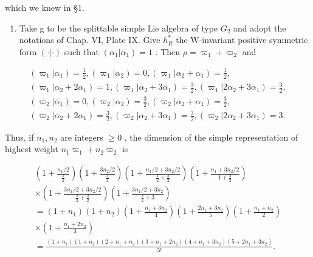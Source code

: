which we knew in §1.

\begin{enumerate}
\def\labelenumi{\arabic{enumi})}
\setcounter{enumi}{1}
\tightlist
\item
  Take g to be the splittable simple Lie algebra of type \(G_{2}\) and adopt the notations of Chap. VI, Plate IX. Give \(h_{R}^{*}\) the W-invariant positive symmetric form \((\cdot|\cdot)\) such that \((\alpha_{1}|\alpha_{1})=1\) . Then \(\rho=\varpi_{1}+\varpi_{2}\) and
\end{enumerate}

\[
\begin{array}{c} (\varpi_ {1} | \alpha_ {1}) = \frac {1}{2}, (\varpi_ {1} | \alpha_ {2}) = 0, (\varpi_ {1} | \alpha_ {2} + \alpha_ {1}) = \frac {1}{2}, \\ (\varpi_ {1} | \alpha_ {2} + 2 \alpha_ {1}) = 1, (\varpi_ {1} | \alpha_ {2} + 3 \alpha_ {1}) = \frac {3}{2}, (\varpi_ {1} | 2 \alpha_ {2} + 3 \alpha_ {1}) = \frac {3}{2}, \\ (\varpi_ {2} | \alpha_ {1}) = 0, (\varpi_ {2} | \alpha_ {2}) = \frac {3}{2}, (\varpi_ {2} | \alpha_ {2} + \alpha_ {1}) = \frac {3}{2}, \\ (\varpi_ {2} | \alpha_ {2} + 2 \alpha_ {1}) = \frac {3}{2}, (\varpi_ {2} | \alpha_ {2} + 3 \alpha_ {1}) = \frac {3}{2}, (\varpi_ {2} | 2 \alpha_ {2} + 3 \alpha_ {1}) = 3. \end{array}
\]

Thus, if \(n_1, n_2\) are integers \(\geq 0\) , the dimension of the simple representation of highest weight \(n_1\varpi_1 + n_2\varpi_2\) is

\[
\begin{array}{c} \left(1 + \frac {n _ {1} / 2}{\frac {1}{2}}\right) \left(1 + \frac {3 n _ {2} / 2}{\frac {3}{2}}\right) \left(1 + \frac {n _ {1} / 2 + 3 n _ {2} / 2}{\frac {1}{2} + \frac {3}{2}}\right) \left(1 + \frac {n _ {1} + 3 n _ {2} / 2}{1 + \frac {3}{2}}\right) \\ \times \left(1 + \frac {3 n _ {1} / 2 + 3 n _ {2} / 2}{\frac {3}{2} + \frac {3}{2}}\right) \left(1 + \frac {3 n _ {1} / 2 + 3 n _ {2}}{\frac {3}{2} + 3}\right) \\ = (1 + n _ {1}) (1 + n _ {2}) \left(1 + \frac {n _ {1} + 3 n _ {2}}{4}\right) \left(1 + \frac {2 n _ {1} + 3 n _ {2}}{5}\right) \left(1 + \frac {n _ {1} + n _ {2}}{2}\right) \\ \times \left(1 + \frac {n _ {1} + 2 n _ {2}}{3}\right) \\ = \frac {(1 + n _ {1}) (1 + n _ {2}) (2 + n _ {1} + n _ {2}) (3 + n _ {1} + 2 n _ {2}) (4 + n _ {1} + 3 n _ {2}) (5 + 2 n _ {1} + 3 n _ {2})}{5 !}. \end{array}
\]

